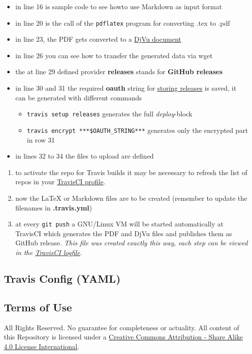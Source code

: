 \documentclass[10pt,letterpaper]{article}
\providecommand{\tightlist}{
  \setlength{\itemsep}{0pt}\setlength{\parskip}{0pt}}
\begin{document}
\begin{itemize}
\tightlist
\item
  in line 16 is sample code to see howto use Markdown as input format
\item
  in line 20 is the call of the \texttt{pdflatex} program for converting
  .tex to .pdf
\item
  in line 23, the PDF gets converted to a
  \href{https://de.wikipedia.org/wiki/DjVu}{DjVu document}
\item
  in line 26 you can see how to transfer the generated data via wget
\item
  the at line 29 defined provider \textbf{releases} stands for
  \textbf{GitHub releases}
\item
  in line 30 and 31 the required \textbf{oauth} string for
  \href{http://docs.travis-ci.com/user/deployment/releases/}{storing
  releases} is saved, it can be generated with different commands

  \begin{itemize}
  \tightlist
  \item
    \texttt{travis\ setup\ releases} generates the full
    \emph{deploy}-block
  \item
    \texttt{travis\ encrypt\ ***\$OAUTH\_STRING***} generates only the
    encrypted part in row 31
  \end{itemize}
\item
  in lines 32 to 34 the files to upload are defined
\end{itemize}

\begin{enumerate}
\def\labelenumi{\arabic{enumi}.}
\tightlist
\item
  to activate the repo for Travis builds it may be necessary to refresh
  the list of repos in your
  \href{https://travis-ci.org/profile}{TravisCI profile}.
\item
  now the LaTeX or Markdown files are to be created (remember to update
  the filenames in \textbf{.travis.yml})
\item
  at every \texttt{git\ push} a GNU/Linux VM will be started
  automatically at TravisCI which generates the PDF and DjVu files and
  publishes them as GitHub release. \emph{This file was created exactly
  this way, each step can be viewed in the
  \href{https://travis-ci.org/SimonWaldherr/testrepo}{TravisCI
  logfile}.}
\end{enumerate}

\subsection{Travis Config (YAML)}\label{travis-config-yaml}



\subsection{Terms of Use}\label{terms-of-use}

All Rights Reserved. No guarantee for completeness or actuality. All
content of this Repository is licensed under a
\href{http://creativecommons.org/licenses/by-sa/4.0/}{Creative Commons
Attribution - Share Alike 4.0 License International}.
\end{document}
